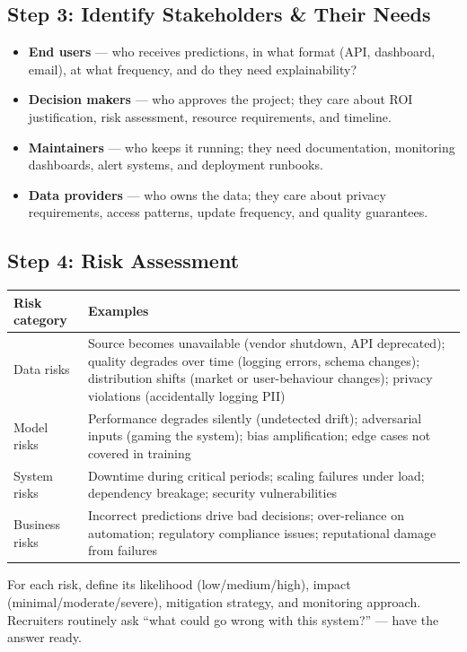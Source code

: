 \subsection{Step 3: Identify Stakeholders \& Their Needs}

\begin{itemize}
  \item \textbf{End users} --- who receives predictions, in what format (API, dashboard, email), at what
  frequency, and do they need explainability?
  \item \textbf{Decision makers} --- who approves the project; they care about ROI justification, risk
  assessment, resource requirements, and timeline.
  \item \textbf{Maintainers} --- who keeps it running; they need documentation, monitoring dashboards, alert
  systems, and deployment runbooks.
  \item \textbf{Data providers} --- who owns the data; they care about privacy requirements, access patterns,
  update frequency, and quality guarantees.
\end{itemize}

\subsection{Step 4: Risk Assessment}

\begin{longtable}{p{} p{}}
\toprule
\textbf{Risk category} & \textbf{Examples} \\
\midrule
\endhead
Data risks & Source becomes unavailable (vendor shutdown, API deprecated); quality degrades over time (logging
errors, schema changes); distribution shifts (market or user-behaviour changes); privacy violations (accidentally
logging PII) \\
Model risks & Performance degrades silently (undetected drift); adversarial inputs (gaming the system); bias
amplification; edge cases not covered in training \\
System risks & Downtime during critical periods; scaling failures under load; dependency breakage; security
vulnerabilities \\
Business risks & Incorrect predictions drive bad decisions; over-reliance on automation; regulatory compliance
issues; reputational damage from failures \\
\bottomrule
\end{longtable}

For each risk, define its likelihood (low/medium/high), impact (minimal/moderate/severe), mitigation strategy, and
monitoring approach. Recruiters routinely ask ``what could go wrong with this system?'' --- have the answer ready.

